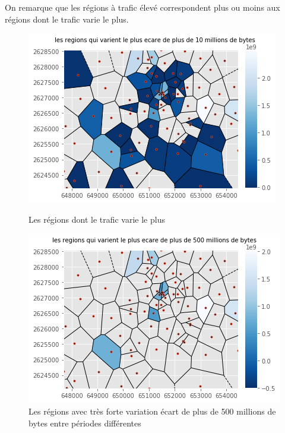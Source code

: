 \documentclass{report}
\begin{document}
On remarque que les régions à trafic élevé correspondent plus ou moins aux régions dont le trafic varie le plus.
\begin{figure}[H]
   \begin{minipage}{0.4\textwidth}
     \centering
     \includegraphics[scale=0.55]{images/var2.png}
     \caption{Les régions dont le trafic varie le plus}\label{Fig:Data1}
   \end{minipage}\hfill
   \begin{minipage}{0.4\textwidth}
     \centering
     \includegraphics[scale=0.55]{images/var1.png}
     \caption{Les régions avec très forte variation écart de plus de 500 millions de bytes entre périodes différentes }\label{Fig:Data2}
   \end{minipage}
\end{figure} 
\end{document}
